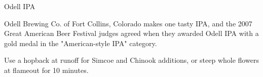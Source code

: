\begin{recipie}{Odell IPA}

\begin{aboutblock}
Odell Brewing Co. of Fort Collins, Colorado makes one tasty IPA, and the 2007
Great American Beer Festival judges agreed when they awarded Odell IPA with a
gold medal in the "American-style IPA" category.
\end{aboutblock}


\begin{methodandtiming}
 
\begin{mashsteps}
\end{mashsteps}

\begin{fermentationsteps}
\end{fermentationsteps}

\begin{directions}
Use a hopback at runoff for  Simcoe and Chinook additions, or steep
whole flowers at flameout for 10 minutes.
\end{directions}

\end{methodandtiming}

\pagebreak

\begin{ingredientsblock}

\begin{malts}
\end{malts}

\begin{hops}
\end{hops}

\begin{yeasts}
\end{yeasts}

\end{ingredientsblock}

\end{recipie}


